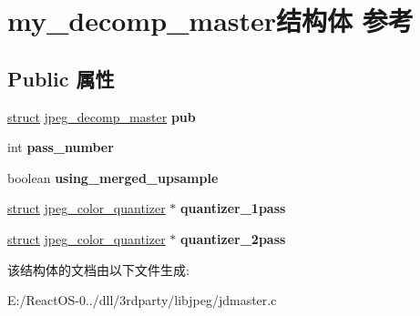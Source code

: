 \hypertarget{structmy__decomp__master}{}\section{my\+\_\+decomp\+\_\+master结构体 参考}
\label{structmy__decomp__master}
\subsection*{Public 属性}
\begin{DoxyCompactItemize}
\item 
\mbox{\label{structmy__decomp__master_ab9a692c30b5f1cc03d9074ad3c69af3f}} 
\hyperlink{interfacestruct}{struct} \hyperlink{structjpeg__decomp__master}{jpeg\+\_\+decomp\+\_\+master} {\bfseries pub}
\item 
\mbox{\label{structmy__decomp__master_a0870daa393b92584b4720171586074a1}} 
int {\bfseries pass\+\_\+number}
\item 
\mbox{\label{structmy__decomp__master_af7ab207dfbf091b4de60e6fe3938f4a4}} 
boolean {\bfseries using\+\_\+merged\+\_\+upsample}
\item 
\mbox{\label{structmy__decomp__master_af72048ba84933f931c09153470ff4f0b}} 
\hyperlink{interfacestruct}{struct} \hyperlink{structjpeg__color__quantizer}{jpeg\+\_\+color\+\_\+quantizer} $\ast$ {\bfseries quantizer\+\_\+1pass}
\item 
\mbox{\label{structmy__decomp__master_a9a5f56ccbaec7d13e08e0cfb9d7a3974}} 
\hyperlink{interfacestruct}{struct} \hyperlink{structjpeg__color__quantizer}{jpeg\+\_\+color\+\_\+quantizer} $\ast$ {\bfseries quantizer\+\_\+2pass}
\end{DoxyCompactItemize}


该结构体的文档由以下文件生成\+:\begin{DoxyCompactItemize}
\item 
E\+:/\+React\+O\+S-\/0../dll/3rdparty/libjpeg/jdmaster.\+c\end{DoxyCompactItemize}
